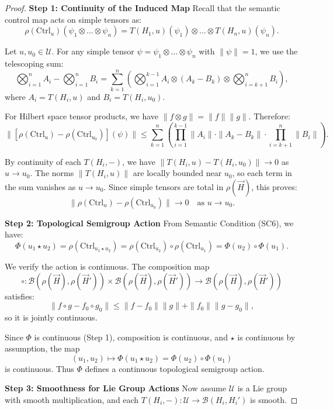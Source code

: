 \documentclass[11pt]{article}
\begin{document}
\begin{proof}

\noindent\textbf{Step 1: Continuity of the Induced Map}
Recall that the semantic control map acts on simple tensors as:
\[
\rho(\mathrm{Ctrl}_u)(\psi_1 \otimes \dots \otimes \psi_n) = T(H_1, u)(\psi_1) \otimes \dots \otimes T(H_n, u)(\psi_n).
\]

Let \(u, u_0 \in \mathcal{U}\). For any simple tensor \(\psi = \psi_1 \otimes \dots \otimes \psi_n\) with \(\|\psi\| = 1\), we use the telescoping sum:
\[
\bigotimes_{i=1}^n A_i - \bigotimes_{i=1}^n B_i = \sum_{k=1}^n \left( \bigotimes_{i=1}^{k-1} A_i \otimes (A_k - B_k) \otimes \bigotimes_{i=k+1}^n B_i \right),
\]
where \(A_i = T(H_i, u)\) and \(B_i = T(H_i, u_0)\).

For Hilbert space tensor products, we have \(\|f \otimes g\| = \|f\|\|g\|\). Therefore:
\[
\|[\rho(\mathrm{Ctrl}_u) - \rho(\mathrm{Ctrl}_{u_0})](\psi)\| \le \sum_{k=1}^n \left( \prod_{i=1}^{k-1} \|A_i\| \cdot \|A_k - B_k\| \cdot \prod_{i=k+1}^n \|B_i\| \right).
\]

By continuity of each \(T(H_i, -)\), we have \(\|T(H_i, u) - T(H_i, u_0)\| \to 0\) as \(u \to u_0\). The norms \(\|T(H_i, u)\|\) are locally bounded near \(u_0\), so each term in the sum vanishes as \(u \to u_0\). Since simple tensors are total in \(\rho(\vec{H})\), this proves:
\[
\|\rho(\mathrm{Ctrl}_u) - \rho(\mathrm{Ctrl}_{u_0})\| \to 0 \quad \text{as } u \to u_0.
\]

\noindent\textbf{Step 2: Topological Semigroup Action}
From Semantic Condition (SC6), we have:
\[
\Phi(u_1 \star u_2) = \rho(\mathrm{Ctrl}_{u_1 \star u_2}) = \rho(\mathrm{Ctrl}_{u_2}) \circ \rho(\mathrm{Ctrl}_{u_1}) = \Phi(u_2) \circ \Phi(u_1).
\]

We verify the action is continuous. The composition map
\[
\circ: \mathcal{B}(\rho(\vec{H}), \rho(\vec{H}')) \times \mathcal{B}(\rho(\vec{H}), \rho(\vec{H}')) \to \mathcal{B}(\rho(\vec{H}), \rho(\vec{H}'))
\]
satisfies:
\[
\|f \circ g - f_0 \circ g_0\| \le \|f - f_0\|\|g\| + \|f_0\|\|g - g_0\|,
\]
so it is jointly continuous.

Since \(\Phi\) is continuous (Step 1), composition is continuous, and \(\star\) is continuous by assumption, the map
\[
(u_1, u_2) \mapsto \Phi(u_1 \star u_2) = \Phi(u_2) \circ \Phi(u_1)
\]
is continuous. Thus \(\Phi\) defines a continuous topological semigroup action.

\noindent\textbf{Step 3: Smoothness for Lie Group Actions}
Now assume \(\mathcal{U}\) is a Lie group with smooth multiplication, and each \(T(H_i, -): \mathcal{U} \to \mathcal{B}(H_i, H_i')\) is smooth.


\end{proof}
\end{document}
